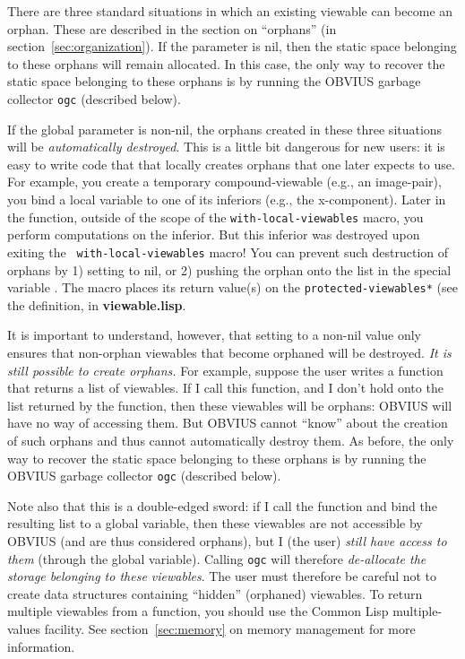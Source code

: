 There are three standard situations in which an existing viewable can
become an orphan.  These are described in the section on ``orphans''
(in section~\ref{sec:organization}).  If the parameter
 is nil, then the static space belonging
to these orphans will remain allocated.  In this case, the only way to
recover the static space belonging to these orphans is by running the
OBVIUS garbage collector {\tt ogc} (described below).

If the global parameter  is non-nil, the
orphans created in these three situations will be {\em automatically
destroyed}.  This is a little bit dangerous for new users: it is easy
to write code that that locally creates orphans that one later expects
to use.  For example, you create a temporary compound-viewable (e.g.,
an image-pair), you bind a local variable to one of its inferiors
(e.g., the x-component).  Later in the function, outside of the scope
of the {\tt with-local-viewables} macro, you perform computations on
the inferior.  But this inferior was destroyed upon exiting the {\tt
with-local-viewables} macro!  You can prevent such destruction of
orphans by 1) setting  to nil, or 2)
pushing the orphan onto the list in the special variable
.  The  macro
places its return value(s) on the {\tt *protected-viewables*} (see the
definition, in {\bf viewable.lisp}.

It is important to understand, however, that setting
 to a non-nil value only ensures that
non-orphan viewables that become orphaned will be destroyed.  {\em It
is still possible to create orphans.} For example, suppose the user
writes a function that returns a list of viewables.  If I call this
function, and I don't hold onto the list returned by the function,
then these viewables will be orphans: OBVIUS will have no way of
accessing them.  But OBVIUS cannot ``know'' about the creation of such
orphans and thus cannot automatically destroy them.  As before, the
only way to recover the static space belonging to these orphans is by
running the OBVIUS garbage collector {\tt ogc} (described below).

Note also that this is a double-edged sword: if I call the function
and bind the resulting list to a global variable, then these viewables
are not accessible by OBVIUS (and are thus considered orphans), but I
(the user) {\em still have access to them} (through the global
variable).  Calling {\tt ogc} will therefore {\em de-allocate the
storage belonging to these viewables}.  The user must therefore be
careful not to create data structures containing ``hidden'' (orphaned)
viewables.  To return multiple viewables from a function, you should
use the Common Lisp multiple-values facility.  See
section~\ref{sec:memory} on memory management for more information.

